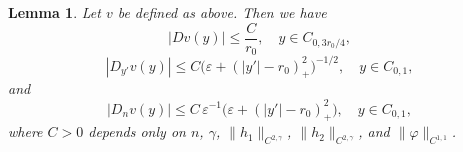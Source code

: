 \documentclass[reqno, 10pt]{amsart}
\theoremstyle{plain}
\newtheorem{lemma}[theorem]{Lemma}
\theoremstyle{definition}
\theoremstyle{remark}
\numberwithin{equation}{section}
\begin{document}
\begin{lemma}%
Let $v$ be defined as above. Then we have
\begin{equation}\label{Dv_uniform_bound}
|Dv(y)| \le \frac{C}{r_0} , \quad y \in C_{0,3r_0/4},
\end{equation}
\begin{equation}\label{D'v-bound}
|D_{y'} v(y)| \le C \big(\varepsilon + (|y'|-r_0)_+^2 \big)^{-1/2}, \quad y \in C_{0,1},
\end{equation}
and
\begin{equation}\label{Dnv-bound}
|D_{n} v(y)| \le C\,\varepsilon^{-1}\big(\varepsilon+(|y'|-r_0)_+^2\big),  \quad y \in C_{0,1},  
\end{equation}
where $C>0$ depends only on $n$, $\gamma$, $\|h_1\|_{C^{2,\gamma}}$, $\|h_2\|_{C^{2,\gamma}}$, and $\|\varphi\|_{C^{1,1}}$.
\end{lemma}
\end{document}
